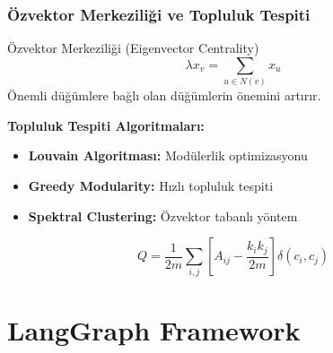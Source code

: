 \documentclass[aspectratio=169]{beamer}
\begin{document}
\begin{frame}
\frametitle{Özvektor Merkeziliği ve Topluluk Tespiti}
\begin{block}{Özvektor Merkeziliği (Eigenvector Centrality)}
$$\lambda x_v = \sum_{u \in N(v)} x_u$$
Önemli düğümlere bağlı olan düğümlerin önemini artırır.
\end{block}

\vspace{0.3cm}
\textbf{Topluluk Tespiti Algoritmaları:}
\begin{itemize}
    \item \textbf{Louvain Algoritması:} Modülerlik optimizasyonu
    \item \textbf{Greedy Modularity:} Hızlı topluluk tespiti
    \item \textbf{Spektral Clustering:} Özvektor tabanlı yöntem
\end{itemize}

\begin{equation}
Q = \frac{1}{2m} \sum_{i,j} \left[ A_{ij} - \frac{k_i k_j}{2m} \right] \delta(c_i, c_j)
\end{equation}
\end{frame}

\section{LangGraph Framework}
\end{document}
